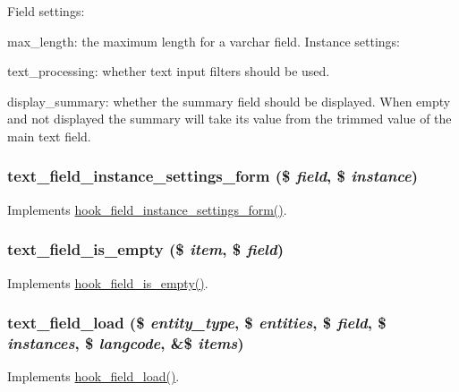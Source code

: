 Field settings:
\begin{DoxyItemize}
\item max\_\-length: the maximum length for a varchar field. Instance settings:
\item text\_\-processing: whether text input filters should be used.
\item display\_\-summary: whether the summary field should be displayed. When empty and not displayed the summary will take its value from the trimmed value of the main text field. 
\end{DoxyItemize}\hypertarget{text_8module_a50788b1f6f044d9adb396021b19e87c2}{
\subsubsection[{text\_\-field\_\-instance\_\-settings\_\-form}]{\setlength{\rightskip}{0pt plus 5cm}text\_\-field\_\-instance\_\-settings\_\-form (\$ {\em field}, \/  \$ {\em instance})}}
\label{text_8module_a50788b1f6f044d9adb396021b19e87c2}
Implements \hyperlink{group__field__types_gacce0ff92e36c0054ad131d95e576a13a}{hook\_\-field\_\-instance\_\-settings\_\-form()}. \hypertarget{text_8module_a65e04fe0635223a533f9335166b45996}{
\subsubsection[{text\_\-field\_\-is\_\-empty}]{\setlength{\rightskip}{0pt plus 5cm}text\_\-field\_\-is\_\-empty (\$ {\em item}, \/  \$ {\em field})}}
\label{text_8module_a65e04fe0635223a533f9335166b45996}
Implements \hyperlink{group__field__types_ga192dd7e7a02a7bc9e0af8b67b187b071}{hook\_\-field\_\-is\_\-empty()}. \hypertarget{text_8module_a76386531217df0ac7e847c8928a29f9a}{
\subsubsection[{text\_\-field\_\-load}]{\setlength{\rightskip}{0pt plus 5cm}text\_\-field\_\-load (\$ {\em entity\_\-type}, \/  \$ {\em entities}, \/  \$ {\em field}, \/  \$ {\em instances}, \/  \$ {\em langcode}, \/  \&\$ {\em items})}}
\label{text_8module_a76386531217df0ac7e847c8928a29f9a}
Implements \hyperlink{group__field__types_ga37f2456e9b5b8b39dc11cffd59163c19}{hook\_\-field\_\-load()}.


